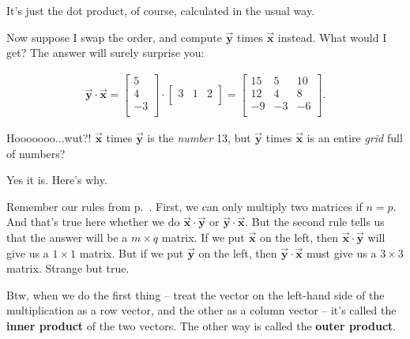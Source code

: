 It's just the dot product, of course, calculated in the usual way.

Now suppose I swap the order, and compute $\overrightarrow{\textbf{y}}$ times
$\overrightarrow{\textbf{x}}$ instead. What would I get? The answer will surely
surprise you:

\vspace{-.15in}
\begin{align*}
\overrightarrow{\textbf{y}} \cdot \overrightarrow{\textbf{x}} =
\begin{bmatrix}
5 \\ 4 \\ -3 \\
\end{bmatrix} \cdot
\begin{bmatrix}
3 & 1 & 2 \\
\end{bmatrix} =
\begin{bmatrix}
15 & 5 & 10 \\
12 & 4 & 8 \\
-9 & -3 & -6 \\
\end{bmatrix}.
\end{align*}
\vspace{-.15in}

Hooooooo...wut?! $\overrightarrow{\textbf{x}}$ times
$\overrightarrow{\textbf{y}}$ is the \textit{number} 13, but
$\overrightarrow{\textbf{y}}$ times $\overrightarrow{\textbf{x}}$ is an entire
\textit{grid} full of numbers?

Yes it is. Here's why. 

Remember our rules from p.~\pageref{matMultRules}. First, we can only multiply
two matrices if $n=p$. And that's true here whether we do
$\overrightarrow{\textbf{x}} \cdot \overrightarrow{\textbf{y}}$ or
$\overrightarrow{\textbf{y}} \cdot \overrightarrow{\textbf{x}}$. But the second
rule tells us that the answer will be a $m\times q$ matrix. If we put
$\overrightarrow{\textbf{x}}$ on the left, then $\overrightarrow{\textbf{x}}
\cdot \overrightarrow{\textbf{y}}$ will give us a $1\times 1$ matrix. But if we
put $\overrightarrow{\textbf{y}}$ on the left, then
$\overrightarrow{\textbf{y}} \cdot \overrightarrow{\textbf{x}}$ must give us a
$3\times 3$ matrix. Strange but true.


Btw, when we do the first thing -- treat the vector on the left-hand side of
the multiplication as a row vector, and the other as a column vector -- it's
called the \textbf{inner product} of the two vectors. The other way is called
the \textbf{outer product}.

